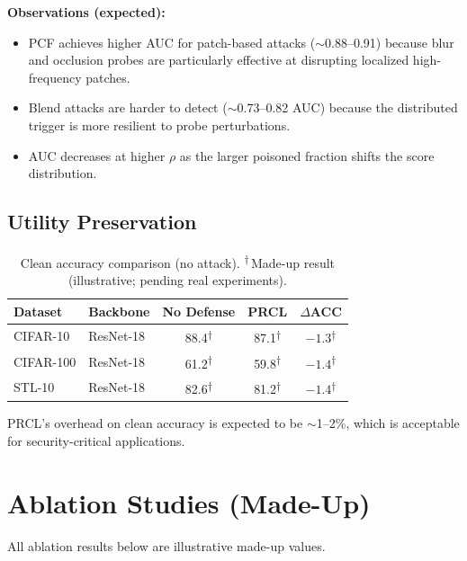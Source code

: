 \documentclass[11pt,a4paper]{article}
\newcommand{\madeupresult}[1]{\textcolor{madeup}{#1\textsuperscript{$\dagger$}}}
\newcommand{\daggernote}{\textsuperscript{$\dagger$}\,\textcolor{madeup}{Made-up result (illustrative; pending real experiments).}}
\begin{document}
\textbf{Observations (expected):}
\begin{itemize}[nosep]
  \item PCF achieves higher AUC for patch-based attacks ($\sim$0.88--0.91)
    because blur and occlusion probes are particularly effective at disrupting
    localized high-frequency patches.
  \item Blend attacks are harder to detect ($\sim$0.73--0.82 AUC) because the
    distributed trigger is more resilient to probe perturbations.
  \item AUC decreases at higher $\rho$ as the larger poisoned fraction shifts
    the score distribution.
\end{itemize}


\subsection{Utility Preservation}

\begin{table}[h]
\centering
\caption{Clean accuracy comparison (no attack). \daggernote}
\label{tab:utility}
\begin{tabular}{@{}llccc@{}}
\toprule
\textbf{Dataset} & \textbf{Backbone}
& \textbf{No Defense} & \textbf{PRCL} & $\Delta$\textbf{ACC} \\
\midrule
CIFAR-10  & ResNet-18
  & \madeupresult{88.4} & \madeupresult{87.1} & \madeupresult{$-1.3$} \\
CIFAR-100 & ResNet-18
  & \madeupresult{61.2} & \madeupresult{59.8} & \madeupresult{$-1.4$} \\
STL-10    & ResNet-18
  & \madeupresult{82.6} & \madeupresult{81.2} & \madeupresult{$-1.4$} \\
\bottomrule
\end{tabular}
\end{table}

PRCL's overhead on clean accuracy is expected to be $\sim$1--2\%, which is
acceptable for security-critical applications.


\section{Ablation Studies (Made-Up)}
\label{sec:ablation}

\begin{madeupbox}
All ablation results below are illustrative made-up values.
\end{madeupbox}
\end{document}

